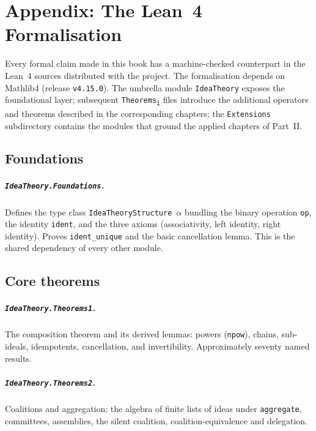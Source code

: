 \chapter*{Appendix: The Lean~4 Formalisation}
\label{app:lean}

Every formal claim made in this book has a machine-checked counterpart in
the Lean~4 sources distributed with the project. The formalisation
depends on Mathlib4 (release \texttt{v4.15.0}). The umbrella module
\texttt{IdeaTheory} exposes the foundational layer; subsequent
\texttt{Theorems\textsubscript{i}} files introduce the additional
operators and theorems described in the corresponding chapters; the
\texttt{Extensions} subdirectory contains the modules that ground the
applied chapters of Part~II.

\section*{Foundations}

\paragraph{\texttt{IdeaTheory.Foundations}.}
Defines the type class \texttt{IdeaTheoryStructure $\alpha$} bundling the
binary operation \texttt{op}, the identity \texttt{ident}, and the three
axioms (associativity, left identity, right identity). Proves
\texttt{ident\_unique} and the basic cancellation lemma. This is the
shared dependency of every other module.

\section*{Core theorems}

\paragraph{\texttt{IdeaTheory.Theorems1}.}
The composition theorem and its derived lemmas: powers
(\texttt{npow}), chains, sub-ideals, idempotents, cancellation, and
invertibility. Approximately seventy named results.

\paragraph{\texttt{IdeaTheory.Theorems2}.}
Coalitions and aggregation: the algebra of finite lists of ideas under
\texttt{aggregate}, committees, assemblies, the silent coalition,
coalition-equivalence and delegation.

